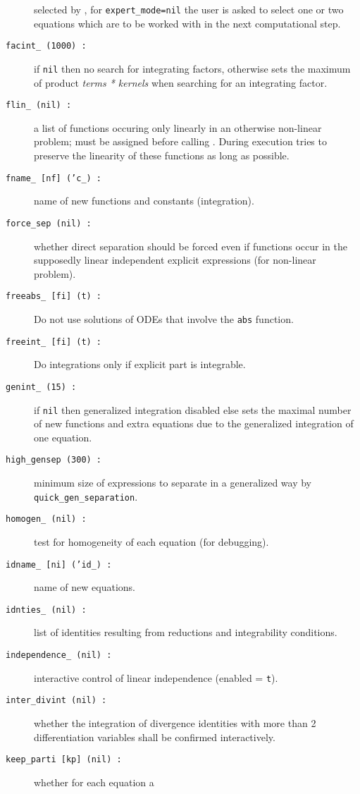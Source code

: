 \begin{description}
  selected by , for \texttt{expert\_mode=nil} the user
  is asked to select one or two equations which are to be worked with
  in the next computational step.
\item[\texttt{facint\_ (1000) :}] if \texttt{nil} then no search for
  integrating factors, otherwise sets the maximum of product
  \emph{terms * kernels} when searching for an integrating factor.
\item[\texttt{flin\_ (nil) :}] a list of functions occuring only
  linearly in an otherwise non-linear problem; must be assigned before
  calling .  During execution  tries to
  preserve the linearity of these functions as long as possible.
\item[\texttt{fname\_ [nf] ('c\_) :}] name of new functions and
  constants (integration).
\item[\texttt{force\_sep (nil) :}] whether direct separation should be
  forced even if functions occur in the supposedly linear independent
  explicit expressions (for non-linear problem).
\item[\texttt{freeabs\_ [fi] (t) :}] Do not use solutions of ODEs that
  involve the \texttt{abs} function.
\item[\texttt{freeint\_ [fi] (t) :}] Do integrations only if explicit
  part is integrable.
\item[\texttt{genint\_ (15) :}] if \texttt{nil} then generalized
  integration disabled else sets the maximal number of new functions
  and extra equations due to the generalized integration of one
  equation.
\item[\texttt{high\_gensep (300) :}] minimum size of expressions to
  separate in a generalized way by \texttt{quick\_gen\_separation}.
\item[\texttt{homogen\_ (nil) :}] test for homogeneity of each
  equation (for debugging).
\item[\texttt{idname\_ [ni] ('id\_) :}] name of new equations.
\item[\texttt{idnties\_ (nil) :}] list of identities resulting from
  reductions and integrability conditions.
\item[\texttt{independence\_ (nil) :}] interactive control of linear
  independence (enabled = \texttt{t}).
\item[\texttt{inter\_divint (nil) :}] whether the integration of
  divergence identities with more than 2 differentiation variables
  shall be confirmed interactively.
\item[\texttt{keep\_parti [kp] (nil) :}] whether for each equation a

\end{description}
